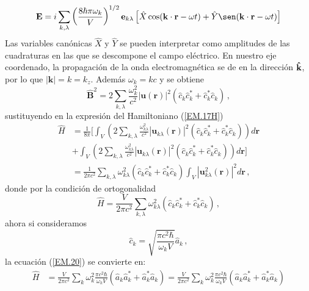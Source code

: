 \begin{equation}
  \mathbf{E} = i \sum_{k,\lambda} \left( \frac{8\hbar \pi \omega_k}{V} \right)^{1/2} \mathbf{e}_{k\lambda} \left[ \hat{X}\cos(\mathbf{k}\cdot\mathbf{r} - \omega t) + \hat{Y}\sen(\mathbf{k}\cdot\mathbf{r} - \omega t) \right]
\end{equation}
Las variables canónicas $\hat{X}$ y $\hat{Y}$ se pueden interpretar como amplitudes de las cuadraturas en las que se descompone el campo eléctrico. \cite{Mandel}
En nuestro eje coordenado, la propagación de la onda electromagnética se de en la dirección $\mathbf{\hat{\textnormal{\bfseries k}}}$, por lo que $|\mathbf{k}| = k = k_z$. Además $\omega_k = kc$ y se obtiene
\begin{equation}
  \label{EM.19}
  \hat{\mathbf{B}}^2 = 2 \sum_{k,\lambda} \frac{\omega_k^2}{c^2}  |\mathbf{u}(\mathbf{r})|^2 \left( \hat{c}_{k} \hat{c}_{k}^* + \hat{c}_{k}^* \hat{c}_{k} \right) \,,
\end{equation}
sustituyendo en la expresión del Hamiltoniano (\ref{EM.17H})
\begin{align}
  \hat{H} & = \frac{1}{8\pi} \Bigg[ \int_V \left( 2\sum_{k,\lambda} \frac{\omega_{k\lambda}^2}{c^2}  |\mathbf{u}_{k\lambda}(\mathbf{r})|^2 \left( \hat{c}_{k} \hat{c}_{k}^* + \hat{c}_{k}^* \hat{c}_{k} \right) \right) d\mathbf{r} \nonumber \\ &+ \int_V \left( 2 \sum_{k,\lambda} \frac{\omega_{k\lambda}^2}{c^2} |\mathbf{u}_{k\lambda}(\mathbf{r})|^2 \left( \hat{c}_{k} \hat{c}_{k}^* + \hat{c}_{k}^* \hat{c}_{k} \right) \right)d\mathbf{r} \Bigg] \nonumber \\
          & = \frac{1}{2\pi c^2} \sum_{k,\lambda} \omega_{k\lambda}^2 \left( \hat{c}_{k} \hat{c}_{k}^* + \hat{c}_{k}^* \hat{c}_{k} \right) \int_V |\mathbf{u}_{k\lambda}^2(\mathbf{r})|^2 d\mathbf{r} \,,
\end{align}
donde por la condición de ortogonalidad
\begin{equation}
  \label{EM.20}
  \hat{H} = \frac{V}{2\pi c^2}\sum_{k,\lambda} \omega_{k\lambda}^2 \left( \hat{c}_{k} \hat{c}_{k}^* + \hat{c}_{k}^* \hat{c}_{k} \right) \,,
\end{equation}
ahora si consideramos
\begin{equation}
  \label{EM.21}
  \hat{c}_{k} = \sqrt{\frac{\pi c^{2}\hbar}{\omega_{k}V}} \hat{a}_{k}\,,
\end{equation}
la ecuaci\'on (\ref{EM.20}) se convierte en:
\begin{align}
  \hat{H} & = \frac{V}{2\pi c^2}\sum_{k} \omega_{k}^2 \frac{\pi c^{2}\hbar}{\omega_{k}V}\left(\hat{a}_{k}\hat{a}^{*}_{k} + \hat{a}_{k}^{*} \hat{a}_{k} \right) = \frac{V}{2\pi c^2}\sum_{k} \omega_{k}^2 \frac{\pi c^{2}\hbar}{\omega_{k}V}\left(\hat{a}_{k}\hat{a}^{*}_{k} + \hat{a}_{k}^{*} \hat{a}_{k} \right) \\
\end{align}
